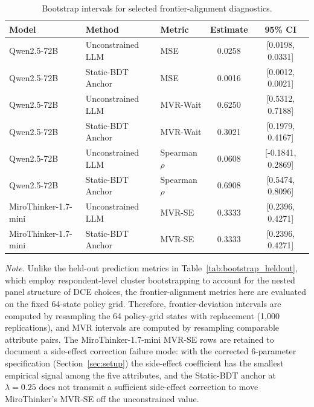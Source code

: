 \documentclass[11pt]{article}
\begin{document}
\begin{table}[t]
\centering
\caption{Bootstrap intervals for selected frontier-alignment diagnostics.}
\label{tab:bootstrap_alignment}
\small
\setlength{\tabcolsep}{6pt}
\begin{tabular}{l l l c c}
\toprule
Model & Method & Metric & Estimate & 95\% CI \\
\midrule
Qwen2.5-72B & Unconstrained LLM & MSE & 0.0258 & [0.0198, 0.0331] \\
Qwen2.5-72B & Static-BDT Anchor & MSE & 0.0016 & [0.0012, 0.0021] \\
\midrule
Qwen2.5-72B & Unconstrained LLM & MVR-Wait & 0.6250 & [0.5312, 0.7188] \\
Qwen2.5-72B & Static-BDT Anchor & MVR-Wait & 0.3021 & [0.1979, 0.4167] \\
\midrule
Qwen2.5-72B & Unconstrained LLM & Spearman \(\rho\) & 0.0608 & [-0.1841, 0.2869] \\
Qwen2.5-72B & Static-BDT Anchor & Spearman \(\rho\) & 0.6908 & [0.5474, 0.8096] \\
\midrule
MiroThinker-1.7-mini & Unconstrained LLM & MVR-SE & 0.3333 & [0.2396, 0.4271] \\
MiroThinker-1.7-mini & Static-BDT Anchor & MVR-SE & 0.3333 & [0.2396, 0.4271] \\
\bottomrule
\end{tabular}

\vspace{0.4em}
\begin{minipage}{0.95\textwidth}
\small
\textit{Note.} Unlike the held-out prediction metrics in Table~\ref{tab:bootstrap_heldout}, which employ respondent-level cluster bootstrapping to account for the nested panel structure of DCE choices, the frontier-alignment metrics here are evaluated on the fixed 64-state policy grid. Therefore, frontier-deviation intervals are computed by resampling the 64 policy-grid states with replacement (1,000 replications), and MVR intervals are computed by resampling comparable attribute pairs. The MiroThinker-1.7-mini MVR-SE rows are retained to document a side-effect correction failure mode: with the corrected 6-parameter specification (Section~\ref{sec:setup}) the side-effect coefficient has the smallest empirical signal among the five attributes, and the Static-BDT anchor at $\lambda = 0.25$ does not transmit a sufficient side-effect correction to move MiroThinker's MVR-SE off the unconstrained value.
\end{minipage}
\end{table}
\end{document}

